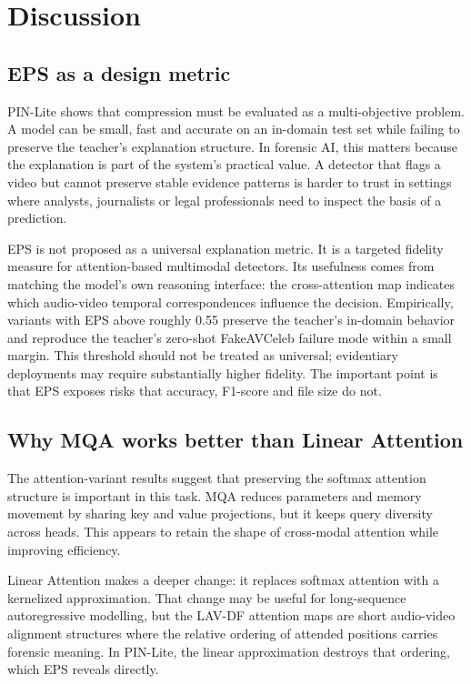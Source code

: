 \documentclass[pdflatex,sn-basic,Numbered]{sn-jnl}
\begin{document}
\section{Discussion}\label{sec:discussion}

\subsection{EPS as a design metric}\label{subsec:accuracy-risk}

PIN-Lite shows that compression must be evaluated as a multi-objective problem. A model can be small, fast and accurate on an in-domain test set while failing to preserve the teacher's explanation structure. In forensic AI, this matters because the explanation is part of the system's practical value. A detector that flags a video but cannot preserve stable evidence patterns is harder to trust in settings where analysts, journalists or legal professionals need to inspect the basis of a prediction.

EPS is not proposed as a universal explanation metric. It is a targeted fidelity measure for attention-based multimodal detectors. Its usefulness comes from matching the model's own reasoning interface: the cross-attention map indicates which audio-video temporal correspondences influence the decision. Empirically, variants with EPS above roughly 0.55 preserve the teacher's in-domain behavior and reproduce the teacher's zero-shot FakeAVCeleb failure mode within a small margin. This threshold should not be treated as universal; evidentiary deployments may require substantially higher fidelity. The important point is that EPS exposes risks that accuracy, F1-score and file size do not.

\subsection{Why MQA works better than Linear Attention}\label{subsec:mqa}

The attention-variant results suggest that preserving the softmax attention structure is important in this task. MQA reduces parameters and memory movement by sharing key and value projections, but it keeps query diversity across heads. This appears to retain the shape of cross-modal attention while improving efficiency.

Linear Attention makes a deeper change: it replaces softmax attention with a kernelized approximation. That change may be useful for long-sequence autoregressive modelling, but the LAV-DF attention maps are short audio-video alignment structures where the relative ordering of attended positions carries forensic meaning. In PIN-Lite, the linear approximation destroys that ordering, which EPS reveals directly.
\end{document}
